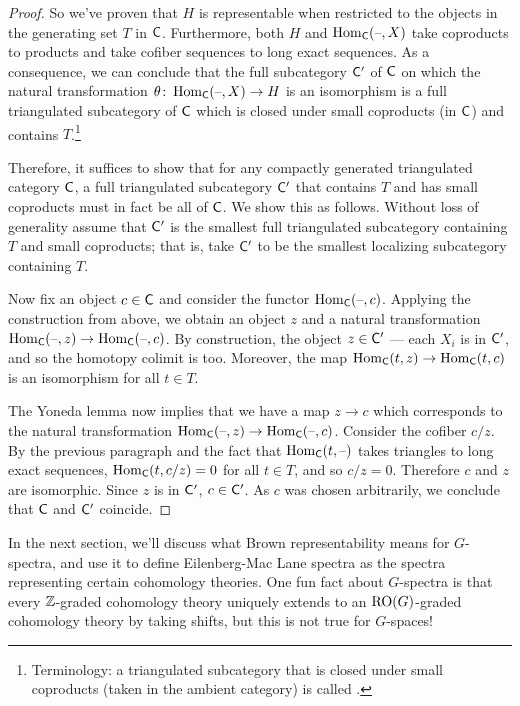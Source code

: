 \begin{proof}
So we've proven that $H$ is representable when restricted to the objects in the generating set $T$ in $\mathsf C$.
Furthermore, both $H$ and $\operatorname{Hom}_\mathsf C(\text{--},X)$ take coproducts to products and take cofiber sequences to long exact
sequences. As a consequence, we can conclude that the full subcategory $\mathsf C'$ of $\mathsf C$ on which the natural
transformation $\theta\colon \operatorname{Hom}_\mathsf C(\text{--},X)\to H$ is an isomorphism is a full triangulated subcategory of $\mathsf C$
which is closed under small coproducts (in $\mathsf C$) and contains $T$.\footnote{Terminology: a triangulated
subcategory that is closed under small coproducts (taken in the ambient category) is called
.}

Therefore, it suffices to show that for any compactly generated triangulated category $\mathsf C$, a full triangulated
subcategory $\mathsf C'$ that contains $T$ and has small coproducts must in fact be all of $\mathsf C$. We show this as
follows. Without loss of generality assume that $\mathsf C'$ is the smallest full triangulated subcategory containing $T$
and small coproducts; that is, take $\mathsf C'$ to be the smallest localizing subcategory containing $T$.

Now fix an object $c\in\mathsf C$ and consider the functor $\operatorname{Hom}_\mathsf C(\text{--},c)$. Applying the construction from above, we
obtain an object $z$ and a natural transformation $\operatorname{Hom}_\mathsf C(\text{--},z) \to \operatorname{Hom}_\mathsf C(\text{--},c)$. By construction, the
object $z\in\mathsf C'$ --- each $X_i$ is in $\mathsf C'$, and so the homotopy colimit is too. Moreover, the map
$\operatorname{Hom}_\mathsf C(t,z)\to \operatorname{Hom}_\mathsf C(t,c)$ is an isomorphism for all $t\in T$.

The Yoneda lemma now implies that we have a map $z\to c$ which corresponds to the natural transformation
$\operatorname{Hom}_\mathsf C(\text{--},z) \to \operatorname{Hom}_\mathsf C(\text{--},c)$. Consider the cofiber $c/z$. By the previous paragraph and the fact that
$\operatorname{Hom}_\mathsf C(t,\text{--})$ takes triangles to long exact sequences, $\operatorname{Hom}_\mathsf C(t, c/z) = 0$ for all $t\in T$, and so $c/z =
0$. Therefore $c$ and $z$ are isomorphic. Since $z$ is in $\mathsf C'$, $c\in\mathsf C'$. As $c$ was chosen arbitrarily, we
conclude that $\mathsf C$ and $\mathsf C'$ coincide. 
\end{proof}
In the next section, we'll discuss what Brown representability means for $G$-spectra, and use it to define
Eilenberg-Mac Lane spectra as the spectra representing certain cohomology theories. One fun fact about $G$-spectra
is that every $\mathbb Z$-graded cohomology theory uniquely extends to an $\mathrm{RO}(G)$-graded cohomology theory by taking
shifts, but this is not true for $G$-spaces!
